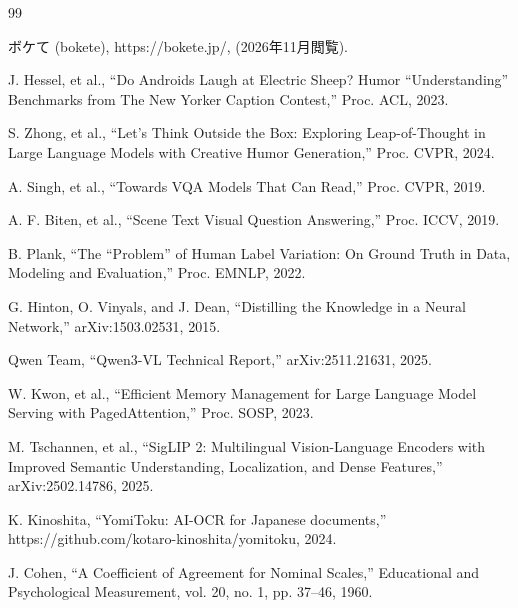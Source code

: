 \begin{thebibliography}{99}

    ボケて (bokete), https://bokete.jp/, (2026年11月閲覧).

    J. Hessel, et al., ``Do Androids Laugh at Electric Sheep? Humor ``Understanding'' Benchmarks from The New Yorker Caption Contest,'' Proc. ACL, 2023.

    S. Zhong, et al., ``Let's Think Outside the Box: Exploring Leap-of-Thought in Large Language Models with Creative Humor Generation,'' Proc. CVPR, 2024.

    A. Singh, et al., ``Towards VQA Models That Can Read,'' Proc. CVPR, 2019.

    A. F. Biten, et al., ``Scene Text Visual Question Answering,'' Proc. ICCV, 2019.

    B. Plank, ``The ``Problem'' of Human Label Variation: On Ground Truth in Data, Modeling and Evaluation,'' Proc. EMNLP, 2022.

    G. Hinton, O. Vinyals, and J. Dean, ``Distilling the Knowledge in a Neural Network,'' arXiv:1503.02531, 2015.

    Qwen Team, ``Qwen3-VL Technical Report,'' arXiv:2511.21631, 2025.

    W. Kwon, et al., ``Efficient Memory Management for Large Language Model Serving with PagedAttention,'' Proc. SOSP, 2023.

    M. Tschannen, et al., ``SigLIP 2: Multilingual Vision-Language Encoders with Improved Semantic Understanding, Localization, and Dense Features,'' arXiv:2502.14786, 2025.

    K. Kinoshita, ``YomiToku: AI-OCR for Japanese documents,'' https://github.com/kotaro-kinoshita/yomitoku, 2024.

    J. Cohen, ``A Coefficient of Agreement for Nominal Scales,'' Educational and Psychological Measurement, vol. 20, no. 1, pp. 37--46, 1960.

\end{thebibliography}
